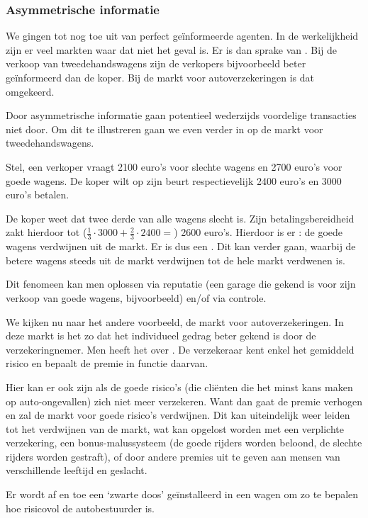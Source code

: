\subsubsection{Asymmetrische informatie}\label{sec:asyinfo}

We gingen tot nog toe uit van perfect ge\"informeerde agenten. In de werkelijkheid zijn er veel markten waar dat niet het geval is. Er is dan sprake van . Bij de verkoop van tweedehandswagens zijn de verkopers bijvoorbeeld beter ge\"informeerd dan de koper. Bij de markt voor autoverzekeringen is dat omgekeerd. \\

\par Door asymmetrische informatie gaan potentieel wederzijds voordelige transacties niet door. Om dit te illustreren gaan we even verder in op de markt voor tweedehandswagens. 
\par Stel, een verkoper vraagt 2100 euro's voor slechte wagens en 2700 euro's voor goede wagens. De koper wilt op zijn beurt respectievelijk 2400 euro's en 3000 euro's betalen.\\

\par De koper weet dat twee derde van alle wagens slecht is. Zijn betalingsbereidheid zakt hierdoor tot ($\frac{1}{3}\cdot 3000+\frac{2}{3}\cdot 2400=$) 2600 euro's. Hierdoor is er  : de goede wagens verdwijnen uit de markt. Er is dus een . Dit kan verder gaan, waarbij de betere wagens steeds uit de markt verdwijnen tot de hele markt verdwenen is.
\par Dit fenomeen kan men oplossen via reputatie (een garage die gekend is voor zijn verkoop van goede wagens, bijvoorbeeld) en/of via controle.\\

\par We kijken nu naar het andere voorbeeld, de markt voor autoverzekeringen. In deze markt is het zo dat het individueel gedrag beter gekend is door de verzekeringnemer. Men heeft het over . De verzekeraar kent enkel het gemiddeld risico en bepaalt de premie in functie daarvan.
\par Hier kan er ook  zijn als de goede risico's (die cli\"enten die het minst kans maken op auto-ongevallen) zich niet meer verzekeren. Want dan gaat de premie verhogen en zal de markt voor goede risico's verdwijnen. Dit kan uiteindelijk weer leiden tot het verdwijnen van de markt, wat kan opgelost worden met een verplichte verzekering, een bonus-malussysteem (de goede rijders worden beloond, de slechte rijders worden gestraft), of door andere premies uit te geven aan mensen van verschillende leeftijd en geslacht.
\par Er wordt af en toe een `zwarte doos' ge\"installeerd in een wagen om zo te bepalen hoe risicovol de autobestuurder is.\\


